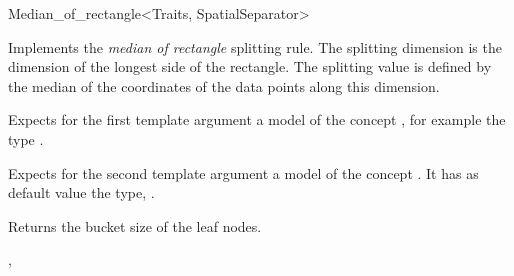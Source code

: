 
\begin{ccRefFunctionObjectClass}{Median_of_rectangle<Traits, SpatialSeparator>}

\ccDefinition
Implements the {\em median of rectangle} splitting rule.
The splitting dimension is the dimension of the longest side of the rectangle.
The splitting value is defined by the median of the coordinates of the data points
along this dimension.


\ccParameters

Expects for the first template argument a model of
the concept , for example
the type .


Expects for the second template argument a model of the concept . It has as default value
the type, .


\ccIsModel


\ccCreation
{}  %


\ccOperations
{} {Returns the bucket size of the leaf nodes.}





\ccSeeAlso

,\\

\end{ccRefFunctionObjectClass}




